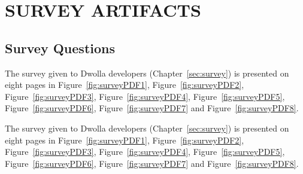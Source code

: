 \chapter{SURVEY ARTIFACTS}
\label{ch10}
\section*{Survey Questions}
\label{app:surveyQuestions}
The survey given to Dwolla developers (Chapter~\ref{sec:survey}) is presented on eight pages in Figure~\ref{fig:surveyPDF1}, Figure~\ref{fig:surveyPDF2}, Figure~\ref{fig:surveyPDF3}, Figure~\ref{fig:surveyPDF4}, Figure~\ref{fig:surveyPDF5}, Figure~\ref{fig:surveyPDF6}, Figure~\ref{fig:surveyPDF7} and  Figure~\ref{fig:surveyPDF8}.

The survey given to Dwolla developers (Chapter~\ref{sec:survey}) is presented on eight pages in Figure~\ref{fig:surveyPDF1}, Figure~\ref{fig:surveyPDF2}, Figure~\ref{fig:surveyPDF3}, Figure~\ref{fig:surveyPDF4}, Figure~\ref{fig:surveyPDF5}, Figure~\ref{fig:surveyPDF6}, Figure~\ref{fig:surveyPDF7} and  Figure~\ref{fig:surveyPDF8}.


